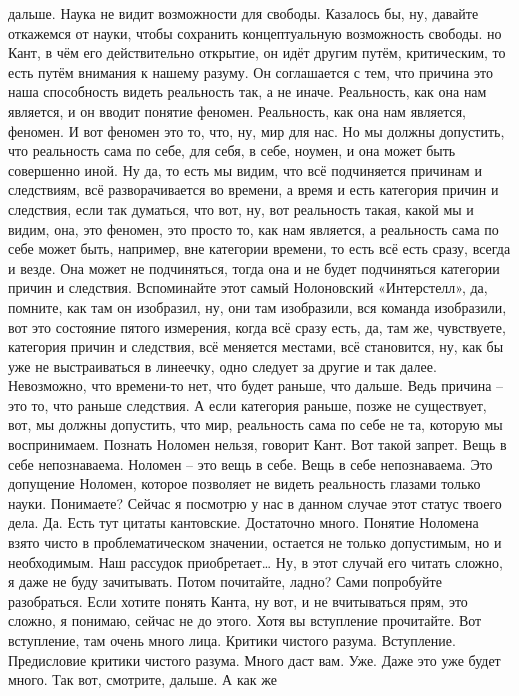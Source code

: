 дальше. Наука не видит возможности для свободы. Казалось бы, ну, давайте
откажемся от науки, чтобы сохранить концептуальную возможность свободы. но Кант,
в чём его действительно открытие, он идёт другим путём, критическим, то есть
путём внимания к нашему разуму. Он соглашается с тем, что причина это наша
способность видеть реальность так, а не иначе. Реальность, как она нам является,
и он вводит понятие феномен. Реальность, как она нам является, феномен. И вот
феномен это то, что, ну, мир для нас. Но мы должны допустить, что реальность
сама по себе, для себя, в себе, ноумен, и она может быть совершенно иной. Ну да,
то есть мы видим, что всё подчиняется причинам и следствиям, всё разворачивается
во времени, а время и есть категория причин и следствия, если так думаться, что
вот, ну, вот реальность такая, какой мы и видим, она, это феномен, это просто
то, как нам является, а реальность сама по себе может быть, например, вне
категории времени, то есть всё есть сразу, всегда и везде. Она может не
подчиняться, тогда она и не будет подчиняться категории причин и следствия.
Вспоминайте этот самый Нолоновский «Интерстелл», да, помните, как там он
изобразил, ну, они там изобразили, вся команда изобразили, вот это состояние
пятого измерения, когда всё сразу есть, да, там же, чувствуете, категория причин
и следствия, всё меняется местами, всё становится, ну, как бы уже не
выстраиваться в линеечку, одно следует за другие и так далее. Невозможно, что
времени-то нет, что будет раньше, что дальше. Ведь причина – это то, что раньше
следствия. А если категория раньше, позже не существует, вот, мы должны
допустить, что мир, реальность сама по себе не та, которую мы воспринимаем.
Познать Ноломен нельзя, говорит Кант. Вот такой запрет. Вещь в себе
непознаваема. Ноломен – это вещь в себе. Вещь в себе непознаваема. Это допущение
Ноломен, которое позволяет не видеть реальность глазами только науки. Понимаете?
Сейчас я посмотрю у нас в данном случае этот статус твоего дела. Да. Есть тут
цитаты кантовские. Достаточно много. Понятие Ноломена взято чисто в
проблематическом значении, остается не только допустимым, но и необходимым. Наш
рассудок приобретает… Ну, в этот случай его читать сложно, я даже не буду
зачитывать. Потом почитайте, ладно? Сами попробуйте разобраться. Если хотите
понять Канта, ну вот, и не вчитываться прям, это сложно, я понимаю, сейчас не до
этого. Хотя вы вступление прочитайте. Вот вступление, там очень много лица.
Критики чистого разума. Вступление. Предисловие критики чистого разума. Много
даст вам. Уже. Даже это уже будет много. Так вот, смотрите, дальше. А как же
